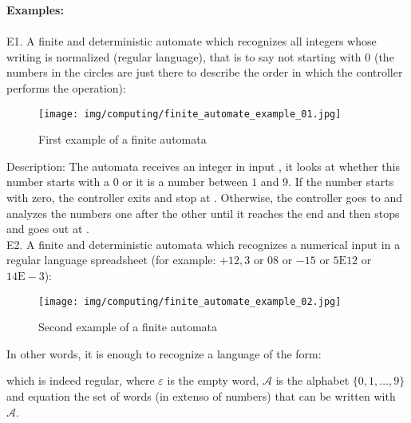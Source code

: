 	\begin{tcolorbox}[colframe=black,colback=white,sharp corners]
	\textbf{{\Large {}}Examples:}\\\\
	E1. A finite and deterministic automate which recognizes all integers whose writing is normalized (regular language), that is to say not starting with $0$ (the numbers in the circles are just there to describe the order in which the controller performs the operation):
	\begin{figure}[H]
		\centering
		\texttt{[image: img/computing/finite\_automate\_example\_01.jpg]}
		\caption{First example of a finite automata}
	\end{figure}
	Description: The automata receives an integer in input , it looks at whether this number starts with a $0$ or it is a number between $1$ and $9$. If the number starts with zero, the controller exits and stop at . Otherwise, the controller goes to  and analyzes the numbers one after the other until it reaches the end and then stops and goes out at .\\
	
	E2. A finite and deterministic automata which recognizes a numerical input in a regular language spreadsheet (for example: $+12,3$ or $08$ or $-15$ or $5\text{E}12$ or $14\text{E}-3$):
	\begin{figure}[H]
		\centering
		\texttt{[image: img/computing/finite\_automate\_example\_02.jpg]}
		\caption{Second example of a finite automata}
	\end{figure}
	In other words, it is enough to recognize a language of the form:
	
	which is indeed regular, where $\varepsilon$ is the empty word, $\mathcal{A}$ is the alphabet $\{0,1, \ldots, 9\}$ and equation the set of words (in extenso of numbers) that can be written with $\mathcal{A}$.
	\end{tcolorbox}
	
